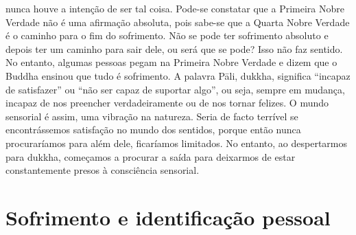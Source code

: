 nunca houve a intenção de ser tal coisa.
Pode-se constatar que a Primeira Nobre Verdade não é
uma afirmação absoluta, pois sabe-se que a Quarta Nobre
Verdade é o caminho para o fim do sofrimento. Não se pode
ter sofrimento absoluto e depois ter um caminho para sair
dele, ou será que se pode? Isso não faz sentido. No entanto,
algumas pessoas pegam na Primeira Nobre Verdade e dizem
que o Buddha ensinou que tudo é sofrimento.
A palavra Pāli, dukkha, significa “incapaz de satisfazer” ou
“não ser capaz de suportar algo”, ou seja, sempre em mudança,
incapaz de nos preencher verdadeiramente ou de nos tornar
felizes. O mundo sensorial é assim, uma vibração na natureza.
Seria de facto terrível se encontrássemos satisfação no mundo
dos sentidos, porque então nunca procuraríamos para além
dele, ficaríamos limitados. No entanto, ao despertarmos para
dukkha, começamos a procurar a saída para deixarmos de
estar constantemente presos à consciência sensorial.

\section{Sofrimento e identificação pessoal}

